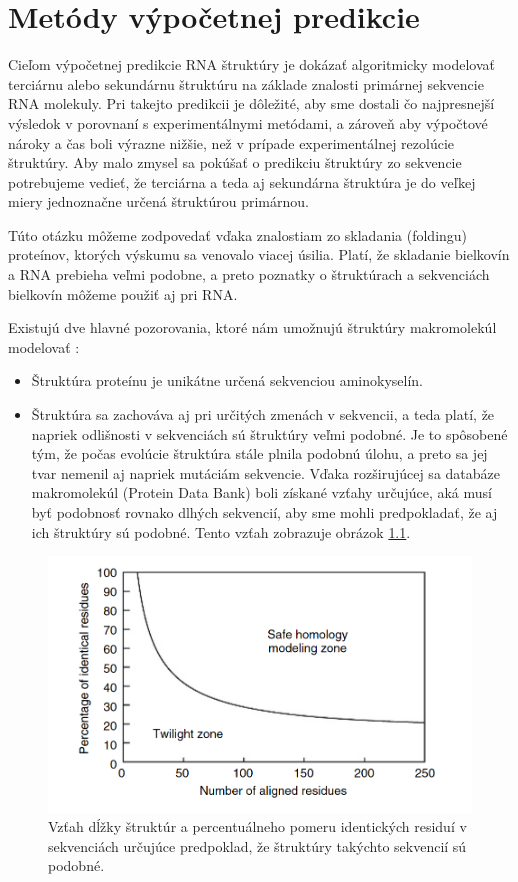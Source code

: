 \chapter{Metódy výpočetnej predikcie}
Cieľom výpočetnej predikcie RNA štruktúry je dokázať algoritmicky modelovať terciárnu alebo sekundárnu štruktúru na základe znalosti primárnej sekvencie RNA molekuly. Pri takejto predikcii je dôležité, aby sme dostali čo najpresnejší výsledok v porovnaní s experimentálnymi metódami, a zároveň aby výpočtové nároky a čas boli výrazne nižšie, než v prípade experimentálnej rezolúcie štruktúry. Aby malo zmysel sa pokúšať o predikciu štruktúry zo sekvencie potrebujeme vedieť, že terciárna a teda aj sekundárna štruktúra je do veľkej miery jednoznačne určená štruktúrou primárnou.  


\indent Túto otázku môžeme zodpovedať vďaka znalostiam zo skladania (foldingu) proteínov, ktorých výskumu sa venovalo viacej úsilia. Platí, že skladanie bielkovín a RNA prebieha veľmi podobne, a preto poznatky o štruktúrach a sekvenciách bielkovín môžeme použiť aj pri RNA. \cite{Moore99} 


\indent  Existujú dve hlavné pozorovania, ktoré nám umožnujú štruktúry makromolekúl modelovať  \cite{Jenny09}:
\begin{itemize}
\item Štruktúra proteínu je unikátne určená sekvenciou aminokyselín.
\item Štruktúra sa zachováva aj pri určitých zmenách v sekvencii, a teda platí, že napriek odlišnosti v sekvenciách sú štruktúry veľmi podobné. Je to spôsobené tým, že počas evolúcie štruktúra stále plnila podobnú úlohu, a preto sa jej tvar nemenil aj napriek mutáciám sekvencie. Vďaka rozširujúcej sa databáze makromolekúl (Protein Data Bank) boli získané vzťahy určujúce, aká musí byť podobnosť rovnako dlhých sekvencií, aby sme mohli predpokladať, že aj ich štruktúry sú podobné. Tento vzťah zobrazuje obrázok  \ref{obr01:aln-zones}.
\end{itemize}

\begin{figure}%
\includegraphics[width=\textwidth]{../img/zones_of_aln}
\caption{Vzťah dĺžky štruktúr a percentuálneho pomeru identických residuí v sekvenciách určujúce predpoklad, že štruktúry takýchto sekvencií sú podobné. \cite{Jenny09}}
\label{obr01:aln-zones}
\end{figure}

